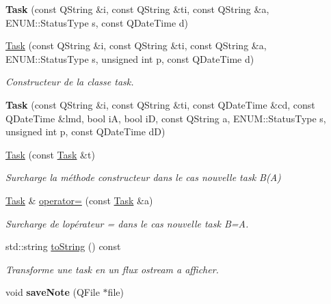 \begin{DoxyCompactItemize}
\item 
\mbox{\label{class_task_a95bb17f3748a1195967d92e73bba8c7c}} 
{\bfseries Task} (const Q\+String \&i, const Q\+String \&ti, const Q\+String \&a, E\+N\+U\+M\+::\+Status\+Type s, const Q\+Date\+Time d)
\item 
\hyperlink{class_task_a08a0f57803d8ef35f687f23f759e9f0c}{Task} (const Q\+String \&i, const Q\+String \&ti, const Q\+String \&a, E\+N\+U\+M\+::\+Status\+Type s, unsigned int p, const Q\+Date\+Time d)
\begin{DoxyCompactList}\small\item\em Constructeur de la classe task. \end{DoxyCompactList}\item 
\mbox{\label{class_task_a5e397a4f57e750bd8624debc2dba5f4a}} 
{\bfseries Task} (const Q\+String \&i, const Q\+String \&ti, const Q\+Date\+Time \&cd, const Q\+Date\+Time \&lmd, bool iA, bool iD, const Q\+String a, E\+N\+U\+M\+::\+Status\+Type s, unsigned int p, const Q\+Date\+Time dD)
\item 
\mbox{\label{class_task_a0aec5018915f11c96398b75f969a3220}} 
\hyperlink{class_task_a0aec5018915f11c96398b75f969a3220}{Task} (const \hyperlink{class_task}{Task} \&t)
\begin{DoxyCompactList}\small\item\em Surcharge la méthode constructeur dans le cas nouvelle task B(\+A) \end{DoxyCompactList}\item 
\mbox{\label{class_task_a2430b942d050bf32c771821daa31493f}} 
\hyperlink{class_task}{Task} \& \hyperlink{class_task_a2430b942d050bf32c771821daa31493f}{operator=} (const \hyperlink{class_task}{Task} \&a)
\begin{DoxyCompactList}\small\item\em Surcharge de l\textquotesingle{}opérateur = dans le cas nouvelle task B=A. \end{DoxyCompactList}\item 
std\+::string \hyperlink{class_task_a7fe5cb7b57a21693e7abfea2f9618563}{to\+String} () const
\begin{DoxyCompactList}\small\item\em Transforme une task en un flux ostream a afficher. \end{DoxyCompactList}\item 
\mbox{\label{class_task_a313eb342d047e8e5cab91bf51609a2f3}} 
void {\bfseries save\+Note} (Q\+File $\ast$file)
\end{DoxyCompactItemize}
